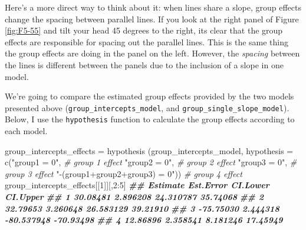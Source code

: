 \documentclass[
]{book}
\newenvironment{Shaded}{\begin{snugshade}}{\end{snugshade}}
\newcommand{\AttributeTok}[1]{\textcolor[rgb]{0.77,0.63,0.00}{#1}}
\newcommand{\CommentTok}[1]{\textcolor[rgb]{0.56,0.35,0.01}{\textit{#1}}}
\newcommand{\DecValTok}[1]{\textcolor[rgb]{0.00,0.00,0.81}{#1}}
\newcommand{\DocumentationTok}[1]{\textcolor[rgb]{0.56,0.35,0.01}{\textbf{\textit{#1}}}}
\newcommand{\FunctionTok}[1]{\textcolor[rgb]{0.00,0.00,0.00}{#1}}
\newcommand{\NormalTok}[1]{#1}
\newcommand{\OtherTok}[1]{\textcolor[rgb]{0.56,0.35,0.01}{#1}}
\newcommand{\SpecialCharTok}[1]{\textcolor[rgb]{0.00,0.00,0.00}{#1}}
\newcommand{\StringTok}[1]{\textcolor[rgb]{0.31,0.60,0.02}{#1}}
\begin{document}
Here's a more direct way to think about it: when lines share a slope, group effects change the spacing between parallel lines. If you look at the right panel of Figure \ref{fig:F5-55} and tilt your head 45 degrees to the right, its clear that the group effects are responsible for spacing out the parallel lines. This is the same thing the group effects are doing in the panel on the left. However, the \emph{spacing} between the lines is different between the panels due to the inclusion of a slope in one model.

We're going to compare the estimated group effects provided by the two models presented above (\texttt{group\_intercepts\_model}, and \texttt{group\_single\_slope\_model}). Below, I use the \texttt{hypothesis} function to calculate the group effects according to each model.

\begin{Shaded}
\begin{Highlighting}[]
\NormalTok{group\_intercepts\_effects }\OtherTok{=} 
  \FunctionTok{hypothesis}\NormalTok{ (group\_intercepts\_model,}
              \AttributeTok{hypothesis =} \FunctionTok{c}\NormalTok{(}\StringTok{"group1 = 0"}\NormalTok{, }\CommentTok{\# group 1 effect}
                             \StringTok{"group2 = 0"}\NormalTok{, }\CommentTok{\# group 2 effect}
                             \StringTok{"group3 = 0"}\NormalTok{, }\CommentTok{\# group 3 effect}
                             \StringTok{"{-}(group1+group2+group3) = 0"}\NormalTok{)) }\CommentTok{\# group 4 effect   }
\NormalTok{group\_intercepts\_effects[[}\DecValTok{1}\NormalTok{]][,}\DecValTok{2}\SpecialCharTok{:}\DecValTok{5}\NormalTok{]}
\DocumentationTok{\#\#    Estimate Est.Error   CI.Lower  CI.Upper}
\DocumentationTok{\#\# 1  30.08481  2.896208  24.310787  35.74068}
\DocumentationTok{\#\# 2  32.79653  3.260648  26.583129  39.21910}
\DocumentationTok{\#\# 3 {-}75.75030  2.444318 {-}80.537948 {-}70.93498}
\DocumentationTok{\#\# 4  12.86896  2.358541   8.181246  17.45949}
\end{Highlighting}
\end{Shaded}
\end{document}

